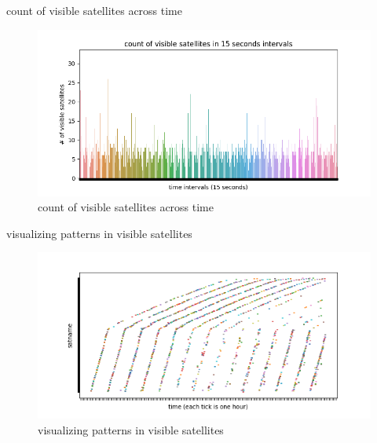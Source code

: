 \documentclass[NET,english,beameralt]{tumbeamer}
\begin{document}
\begin{frame}{count of visible satellites across time}
\begin{figure}
    \includegraphics[width=1\textwidth]{pics/count_visible_satellites.png}
    \caption[short]{count of visible satellites across time}
\end{figure}
\end{frame}

\begin{frame}{visualizing patterns in visible satellites}
\begin{figure}
    \includegraphics[width=1\textwidth]{pics/visualizing-how-long-satellites-are-visible-for.png}
    \caption[short]{visualizing patterns in visible satellites}
\end{figure}
\end{frame}
\end{document}
